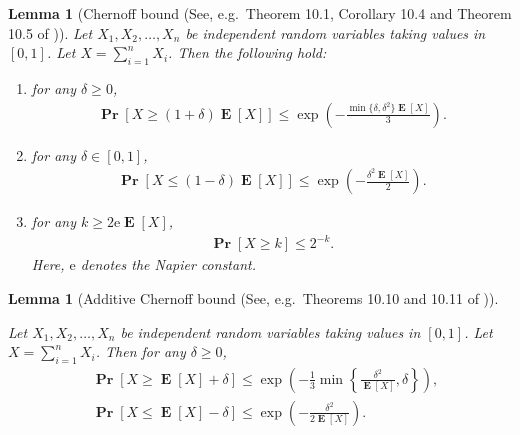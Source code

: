\documentclass[letterpaper,11pt]{article}
\newtheorem{lemma}[theorem]{Lemma}
\renewcommand\Pr{\mathop{\mathbf{Pr}}}
\DeclareMathOperator{\E}{\mathbf{E}}
\begin{document}
\begin{lemma}[Chernoff bound (See, e.g.~Theorem 10.1, Corollary 10.4 and Theorem 10.5 of \cite{Doerr18})]
\label{lem:chernoff}
Let $X_1, X_2, \ldots, X_n$ be independent random variables taking values in $[0,1]$.
Let $X=\sum_{i=1}^nX_i$.
Then the following hold:
\begin{enumerate}[label=(\roman*)]
\item \label{eqn:cher1} for any $\delta\geq 0$, 
\begin{align*}
\Pr[X\geq (1+\delta)\E[X]] \leq \exp\left(-\frac{\min\{\delta,\delta^2\}\E[X]}{3}\right).
\end{align*}
\item \label{eqn:cher2} for any $\delta\in [0,1]$, 
\begin{align*}
\Pr[X\leq (1-\delta)\E[X]] \leq \exp\left(-\frac{\delta^2\E[X]}{2}\right).
\end{align*}
\item \label{eqn:cher3} for any $k\geq 2\mathrm{e}\E[X]$, 
\begin{align*}
\Pr\left[X\geq k \right]\leq 2^{-k}.
\end{align*}
Here, $\mathrm{e}$ denotes the Napier constant.
\end{enumerate}
\end{lemma}

\begin{lemma}[Additive Chernoff bound (See, e.g.~Theorems 10.10 and 10.11 of \cite{Doerr18})]
\label{lem:chernoff-additive}
\ 

\noindent 
Let $X_1, X_2, \ldots, X_n$ be independent random variables taking values in $[0,1]$.
Let $X=\sum_{i=1}^nX_i$.
Then for any $\delta \geq 0$, 
\begin{align*}
&\Pr[X\geq \E[X]+\delta]\leq \exp\left(-\frac{1}{3}\min\left\{\frac{\delta^2}{\E[X]},\delta\right\}\right), \\
&\Pr[X\leq \E[X]-\delta]\leq \exp\left(-\frac{\delta^2}{2\E[X]}\right).
\end{align*}
\end{lemma}
%

\end{document}
